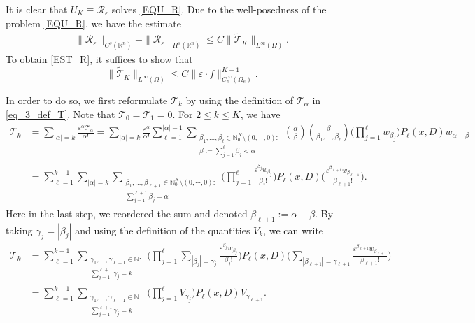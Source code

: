 \documentclass [oneside,11pt] {amsart}
\numberwithin{equation}{section}
\newcommand{\R}{\mathbb{R}}
\begin{document}
It is clear that $U_K\equiv \mathcal{R}_\varepsilon$ solves \eqref{EQU_R}. Due to the well-posedness of the problem \eqref{EQU_R}, we have the estimate
\begin{align*}
\|\mathcal{R}_\varepsilon\|_{C^{s}(\R^n)}+\|\mathcal{R}_\varepsilon\|_{H^{s}(\R^n)}\le  C\|\widetilde{\mathcal{T}}_{K}\|_{L^\infty(\Omega)}.
\end{align*}
To obtain \eqref{EST_R}, it suffices to show that 
\begin{equation}
\label{eq_tilde_T}
\|\widetilde{\mathcal{T}}_{K}\|_{L^\infty(\Omega)}\le C\|\varepsilon\cdot f\|_{C^\infty_c(\Omega_e)}^{K+1}.
\end{equation}




In order to do so, we first reformulate $\mathcal{T}_k$ by using the definition of $\mathcal{T}_\alpha$ in \eqref{eq_3_def_T}. Note that $\mathcal{T}_0=\mathcal{T}_1=0$. For $2\le k\le K$, we have
\begin{align*}
\mathcal T_{k} &= \sum_{|\alpha|=k}\frac{\varepsilon^\alpha\mathcal T_\alpha}{\alpha!}
= \sum_{|\alpha|=k}\frac{\varepsilon^\alpha}{\alpha!}\sum^{|\alpha|-1}_{\ell=1} \sum_{\substack{ \beta_1,\ldots, \beta_\ell\in \mathbb{N}^K_0\setminus(0,\cdots,0)  : \\ \beta:= \sum_{j=1}^\ell\beta_j < \alpha }}\binom{\alpha}{\beta} \binom{\beta}{\beta_1, ..., \beta_\ell}\bigg( \prod_{j=1}^\ell w_{\beta_j } \bigg)    P_\ell(x,D)w_{\alpha-\beta}  
\\ & =
\sum^{k-1}_{\ell=1}\sum_{|\alpha|=k}\sum_{\substack{ \beta_1,\ldots, \beta_{\ell+1}\in \mathbb{N}^K_0\setminus(0,\cdots,0) : \\ \sum_{j=1}^{\ell+1}\beta_j = \alpha }} \bigg( \prod_{j=1}^\ell \frac{\varepsilon^{\beta_j} w_{\beta_j }}{\beta_j!} \bigg)    P_\ell(x,D)\bigg( \frac{\varepsilon^{\beta_{\ell+1}}w_{\beta_{\ell+1}}}{\beta_{\ell+1}!}\bigg).
\end{align*}
Here in the last step, we reordered the sum and denoted $\beta_{\ell+1} := \alpha - \beta$. By taking $\gamma_j = |\beta_j|$ and using the definition of the quantities $V_k$, we can write 
\begin{equation}\label{eq_T_k}
\begin{aligned}
\mathcal T_{k} 
& =
\sum^{k-1}_{\ell=1} \sum_{\substack{ \gamma_1,\ldots, \gamma_{\ell+1}\in \mathbb{N} : \\ \sum_{j=1}^{\ell+1}\gamma_j = k }}  \bigg( \prod_{j=1}^\ell\sum_{|\beta_j|=\gamma_j}  \frac{\varepsilon^{\beta_j} w_{\beta_j }}{\beta_j!} \bigg)    P_\ell(x,D)\bigg( \sum_{|\beta_{\ell+1}|=\gamma_{\ell+1}}\frac{\varepsilon^{\beta_{\ell+1}}w_{\beta_{\ell+1}}}{\beta_{\ell+1}!}\bigg) \\
& = \sum^{k-1}_{\ell=1} \sum_{\substack{ \gamma_1,\ldots, \gamma_{\ell+1}\in \mathbb{N} : \\ \sum_{j=1}^{\ell+1}\gamma_j = k }}  \bigg( \prod_{j=1}^\ell V_{\gamma_j} \bigg)    P_\ell(x,D)V_{\gamma_{\ell+1}}.
\end{aligned}
\end{equation}
\end{document}
